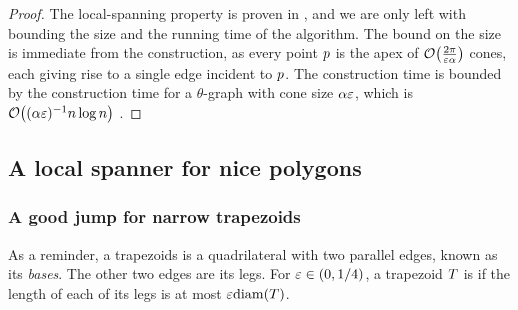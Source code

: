 \documentclass[12pt]{article}%
\begin{document}
\begin{proof}
    The local-spanning property is proven in
    , and we are only left with bounding
    the size and the running time of the algorithm. The bound on the
    size is immediate from the construction, as every point $p$ is
    the apex of $\Of\pth{ \frac{2\pi}{\eps\alpha} }$ cones, each giving
    rise to a single edge incident to $p$.  The construction time is
    bounded by the construction time for a $\theta$-graph with cone
    size $\alpha\varepsilon$, which is $\Of\pth{ (\alpha\eps)^{-1}n\log n}$
    \cite{c-aaspmp-87}.
\end{proof}














\subsection{A local spanner for nice polygons}

\subsubsection{A good jump for narrow trapezoids}

As a reminder, a trapezoids is a quadrilateral with two parallel
edges, known as its \emph{bases}. The other two edges are its legs.
For $\varepsilon \in (0,1/4)$, a trapezoid $T$ is 
if the length of each of its legs is at most $\eps \diamX{\Trap}$.
\end{document}
